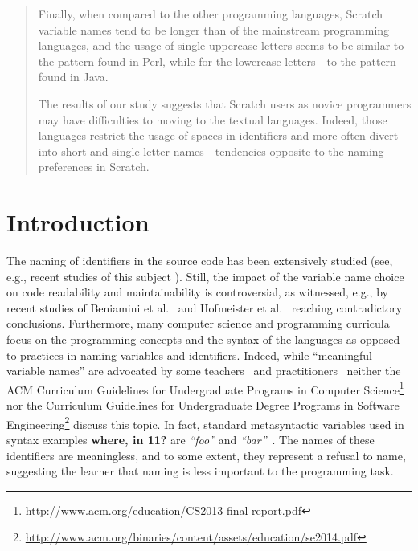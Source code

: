 \documentclass[conference]{IEEEtran}
\newcommand{\todo}[1]{ \textbf{#1} }
\newcommand{\quotes}[1]{\textit{``#1''}}
\begin{document}
\begin{abstract}
Finally, when compared to the other programming languages, Scratch variable names tend to be longer than of the mainstream programming languages, and the usage of single uppercase letters seems to be similar to the pattern found in Perl, while for the lowercase letters---to the pattern found in Java. 

The results of our study suggests that Scratch users as novice programmers may have difficulties to moving to the textual languages. 
Indeed, those languages restrict the usage of spaces in identifiers and more often divert into short and single-letter names---tendencies opposite to the naming preferences in Scratch.%
\end{abstract}

\IEEEpeerreviewmaketitle

\section{Introduction}
The naming of identifiers in the source code has been extensively studied (see, e.g., recent studies of this subject \cite{AmanASK15,AvidanF17,Beniamini,ButlerWYS10,HofmeisterSH17,LunguK13,ScannielloR13,TramontanaRS14}).
Still, the impact of the variable name choice on code readability and maintainability is controversial, as witnessed, e.g., by recent studies of Beniamini et al.~\cite{Beniamini} and Hofmeister et al.~\cite{HofmeisterSH17} reaching contradictory conclusions.
%
Furthermore, many computer science and programming curricula focus on the programming concepts and the syntax of the languages as opposed to practices in naming variables and identifiers. 
Indeed, while ``meaningful variable names'' are advocated by some teachers~\cite{Kato2016, hermans_aivaloglou} and practitioners~\cite{Rother} neither the ACM Curriculum Guidelines for Undergraduate Programs in Computer Science\footnote{\url{http://www.acm.org/education/CS2013-final-report.pdf}} nor the Curriculum Guidelines for Undergraduate Degree Programs in Software Engineering\footnote{\url{http://www.acm.org/binaries/content/assets/education/se2014.pdf}} discuss this topic.
In fact, standard metasyntactic variables used in syntax examples \todo{where, in 11?} are \quotes{foo} and \quotes{bar}~\cite{Raymond}.
The names of these identifiers are meaningless, and to some extent, they represent a refusal to name, suggesting the learner that naming is less important %
to the programming task. 
\end{document}
